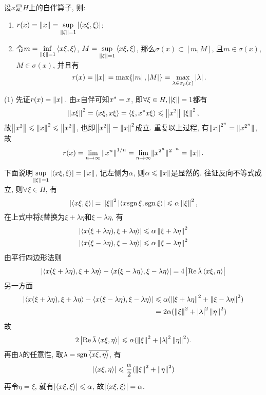 	\begin{Theorem}\label{thm:自伴算子的谱性质}
	设$ x $是$ H $上的自伴算子, 则:
	\begin{enumerate}[(1)]
	\item $ r(x)=\left\| x \right\|=\sup\limits_{\left\| \xi \right\|=1}\left| \left\langle x\xi,\xi \right\rangle \right|  $;
	\item 令$ m=\inf\limits_{\left\| \xi \right\|=1}\left\langle x\xi,\xi \right\rangle $, $ M=\sup\limits_{\left\| \xi \right\|=1}\left\langle x\xi,\xi \right\rangle $, 那么$ \sigma(x)\subset[m,M] $, 且$ m\in\sigma(x) $, $ M\in\sigma(x) $, 并且有
	\[
	r(x)=\left\| x \right\|=\max\{\left| m \right| ,\left| M \right| \}=\max_{\lambda\in\sigma_p(x)}\left| \lambda \right| .
	\]
	\end{enumerate}
	\end{Theorem}
	\begin{Proof}
	(1) 先证$ r(x)=\left\| x \right\| $. 由$ x $自伴可知$ x^{*}=x $, 即$ \forall \xi\in H,\left\| \xi \right\|=1 $都有
	\[
	\left\| x\xi \right\|^2=\left\langle x\xi,x\xi \right\rangle=\left\langle \xi,x^{*}x\xi \right\rangle\leqslant\left\| x^2 \right\|\left\| \xi \right\|^2,
	\]
	故$ \left\| x^2 \right\|\leqslant\left\| x \right\|^2\leqslant\left\| x^2 \right\| $, 也即$ \left\| x^2 \right\|=\left\| x \right\|^2 $成立. 重复以上过程, 有$ \left\| x \right\|^{2^n}=\lVert x^{2^n}\rVert $, 故
	\[
	r(x)=\lim_{n\to\infty}\left\| x^n \right\|^{1/n}=\lim_{n\to \infty}\lVert x^{2^n}\rVert^{2^{-n}}=\left\| x \right\|.
	\]
	
	下面说明$ \sup\limits_{\left\| \xi \right\|=1}\left| \left\langle x\xi,\xi \right\rangle \right| =\left\| x \right\| $, 记左侧为$ \alpha $, 则$ \alpha\leqslant\left\| x \right\| $是显然的. 往证反向不等式成立, 则$ \forall \xi\in H $, 有
	\[
	\left| \left\langle x\xi,\xi \right\rangle \right| =\left\| \xi \right\|^2\left| \left\langle x\mathrm{sgn}\, \xi,\mathrm{sgn}\, \xi \right\rangle \right| \leqslant\alpha\left\| \xi \right\|^2,
	\]
	在上式中将$ \xi $替换为$ \xi+\lambda \eta $和$ \xi-\lambda \eta $, 有
	\[
	\begin{aligned}
	\left| \left\langle x(\xi+\lambda \eta),\xi+\lambda \eta \right\rangle \right| &\leqslant\alpha\left\| \xi+\lambda \eta \right\|^2\\
	\left| \left\langle x(\xi-\lambda \eta),\xi-\lambda \eta \right\rangle \right| &\leqslant\alpha\left\| \xi-\lambda \eta \right\|^2
	\end{aligned}
	\]
	由平行四边形法则
	\[
	\left| \left\langle x(\xi+\lambda \eta),\xi+\lambda \eta \right\rangle-\left\langle x(\xi-\lambda \eta),\xi-\lambda \eta \right\rangle \right| =4\left| \mathrm{Re\,}\bar{\lambda}\left\langle x\xi,\eta \right\rangle \right| 
	\]
	另一方面
	\[
	\begin{aligned}
	\left| \left\langle x(\xi+\lambda \eta),\xi+\lambda \eta \right\rangle-\left\langle x(\xi-\lambda \eta),\xi-\lambda \eta \right\rangle \right| &\leqslant\alpha(\left\| \xi+\lambda \eta \right\|^2+\left\| \xi-\lambda \eta \right\|^2)\\
	&=2\alpha(\left\| \xi \right\|^2+\left| \lambda \right| ^2\left\| \eta \right\|^2)
	\end{aligned}
	\]
	故
	\[
	2\left| \mathrm{Re\,}\bar{\lambda}\left\langle x\xi,\eta \right\rangle \right| \leqslant\alpha(\left\| \xi \right\|^2+\left| \lambda \right| ^2\left\| \eta \right\|^2).
	\]
	再由$ \lambda $的任意性, 取$ \lambda=\mathrm{sgn}\,\overline{\left\langle x\xi,\eta \right\rangle} $, 有
	\[
	\left| \left\langle x\xi,\eta \right\rangle \right| \leqslant\frac{\alpha}{2}(\left\| \xi \right\|^2+\left\| \eta \right\|^2)
	\]
	再令$ \eta=\xi $, 就有$ \left| \left\langle x\xi,\xi \right\rangle \right| \leqslant\alpha $, 故$ \left| \left\langle x\xi,\xi \right\rangle \right| =\alpha $.
	

\end{Proof}
